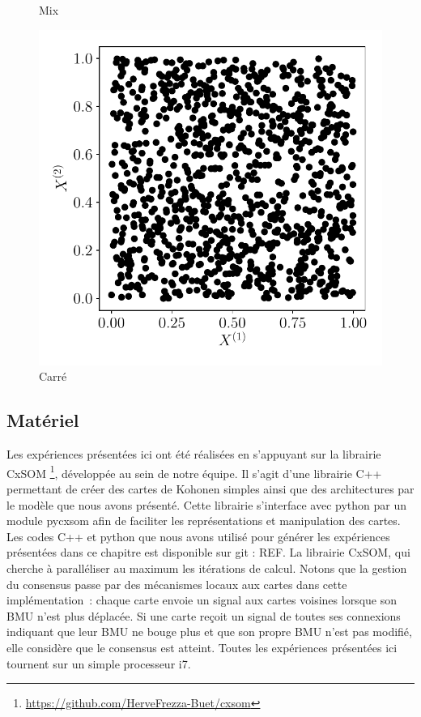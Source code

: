 \documentclass[../main]{subfiles}
\begin{document}
\begin{figure}
\begin{minipage}{\textwidth}
\begin{minipage}{0.3\textwidth}
			\caption{Mix \label{fig:mix}}
		\end{minipage}
		\begin{minipage}{0.3\textwidth}
			\includegraphics[width=\textwidth]{2som_square_in.pdf}
			\caption{Carré \label{fig:mix}}
		\end{minipage}
	\end{minipage}
	
\end{figure}

\subsection{Matériel}

Les expériences présentées ici ont été réalisées en s'appuyant sur la librairie CxSOM \footnote{\url{https://github.com/HerveFrezza-Buet/cxsom}}, développée au sein de notre équipe.
Il s'agit d'une librairie C++ permettant de créer des cartes de Kohonen simples ainsi que des architectures par le modèle que nous avons présenté.
Cette librairie s'interface avec python par un module pycxsom afin de faciliter les représentations et manipulation des cartes.
Les codes C++ et python que nous avons utilisé pour générer les expériences présentées dans ce chapitre est disponible sur git : REF.
La librairie CxSOM, qui cherche à paralléliser au maximum les itérations de calcul.
Notons que la gestion du consensus passe par des mécanismes locaux aux cartes dans cette implémentation~: chaque carte envoie un signal aux cartes voisines lorsque son BMU n'est plus déplacée. Si une carte reçoit un signal de toutes ses connexions indiquant que leur BMU ne bouge plus et que son propre BMU n'est pas modifié, elle considère que le consensus est atteint.
Toutes les expériences présentées ici tournent sur un simple processeur i7.
\end{document}

